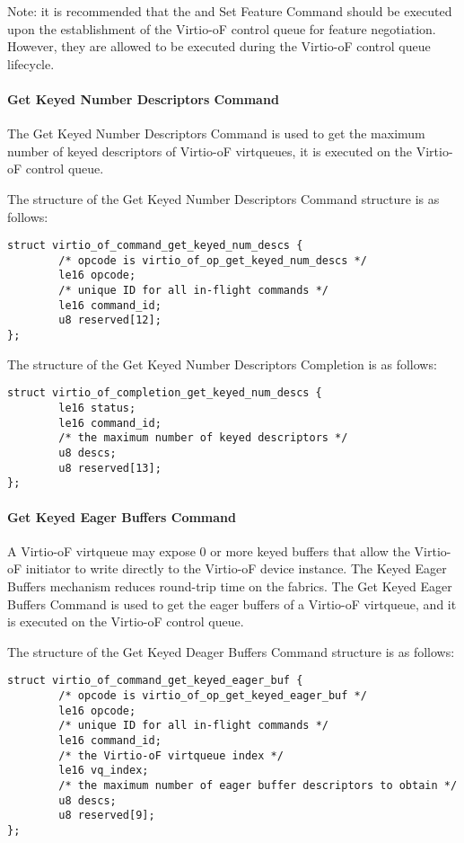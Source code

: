 Note: it is recommended that the
and Set Feature Command should be executed upon the establishment of the Virtio-oF control queue for feature negotiation.
However, they are allowed to be executed during the Virtio-oF control queue lifecycle.

\paragraph{Get Keyed Number Descriptors Command}\label{sec:Virtio Transport Options / Virtio Over Fabrics / Commands Definition / Opcodes / Get Keyed Number Descriptors Command}
The Get Keyed Number Descriptors Command is used to get the maximum number of keyed descriptors of Virtio-oF virtqueues, it is executed on the Virtio-oF control queue.

The structure of the Get Keyed Number Descriptors Command structure is as follows:
\begin{lstlisting}
struct virtio_of_command_get_keyed_num_descs {
        /* opcode is virtio_of_op_get_keyed_num_descs */
        le16 opcode;
        /* unique ID for all in-flight commands */
        le16 command_id;
        u8 reserved[12];
};
\end{lstlisting}

The structure of the Get Keyed Number Descriptors Completion is as follows:
\begin{lstlisting}
struct virtio_of_completion_get_keyed_num_descs {
        le16 status;
        le16 command_id;
        /* the maximum number of keyed descriptors */
        u8 descs;
        u8 reserved[13];
};
\end{lstlisting}

\paragraph{Get Keyed Eager Buffers Command}\label{sec:Virtio Transport Options / Virtio Over Fabrics / Commands Definition / Opcodes / Get Keyed Eager Buffers Command}
A Virtio-oF virtqueue may expose 0 or more keyed buffers that allow the Virtio-oF initiator to write directly to the Virtio-oF device instance.
The Keyed Eager Buffers mechanism reduces round-trip time on the fabrics.
The Get Keyed Eager Buffers Command is used to get the eager buffers of a Virtio-oF virtqueue,
and it is executed on the Virtio-oF control queue.

The structure of the Get Keyed Deager Buffers Command structure is as follows:
\begin{lstlisting}
struct virtio_of_command_get_keyed_eager_buf {
        /* opcode is virtio_of_op_get_keyed_eager_buf */
        le16 opcode;
        /* unique ID for all in-flight commands */
        le16 command_id;
        /* the Virtio-oF virtqueue index */
        le16 vq_index;
        /* the maximum number of eager buffer descriptors to obtain */
        u8 descs;
        u8 reserved[9];
};
\end{lstlisting}

